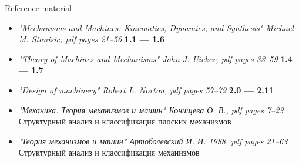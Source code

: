 \documentclass[aspectratio=169]{beamer}
\newcommand{\fbckg}[1]{\usebackgroundtemplate{\texttt{[image: \#1]}}}%
\begin{document}
\begin{frame}[t]{Reference material}
    \begin{itemize}
        \item \textit{"Mechanisms and Machines: Kinematics, Dynamics, and Synthesis" Michael M. Stanisic, pdf pages 21--56 } \textbf{1.1 --- 1.6}
        \item \textit{"Theory of Machines and Mechanisms" John J. Uicker, pdf pages 33--59 } \textbf{1.4 --- 1.7}
        \item \textit{"Design of machinery" Robert L. Norton, pdf pages 57--79 } \textbf{2.0 --- 2.11}
        \item \textit{"Механика. Теория механизмов и машин" Конищева О. В., pdf pages 7--23 } \\ Структурный анализ и классификация плоских механизмов
        \item \textit{"Теория механизмов и машин" Артоболевский И. И. 1988, pdf pages 21--63 } \\ Структурный анализ и классификация механизмов
    \end{itemize}
\end{frame}

\fbckg{fibeamer/figs/last_page.png}
\frame[plain]{}
\end{document}
